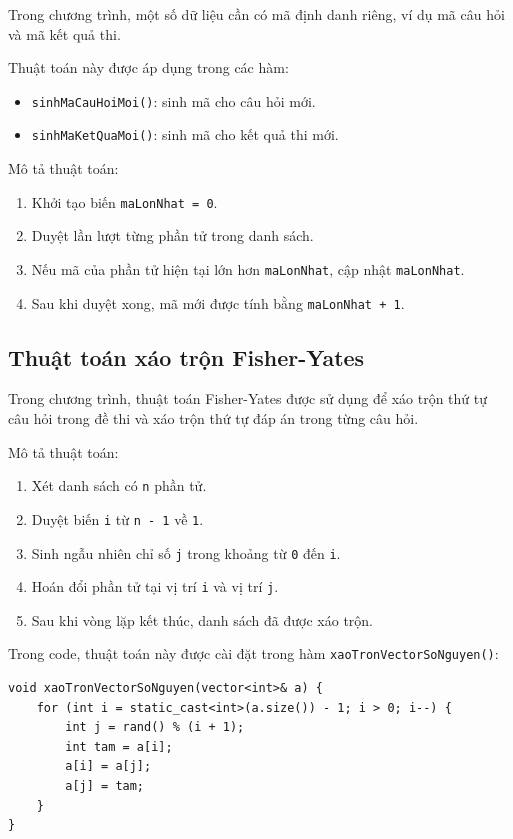 \documentclass[12pt,a4paper]{report}
\begin{document}
Trong chương trình, một số dữ liệu cần có mã định danh riêng, ví dụ mã câu hỏi và mã kết quả thi.

Thuật toán này được áp dụng trong các hàm:

\begin{itemize}
    \item \texttt{sinhMaCauHoiMoi()}: sinh mã cho câu hỏi mới.
    \item \texttt{sinhMaKetQuaMoi()}: sinh mã cho kết quả thi mới.
\end{itemize}

Mô tả thuật toán:

\begin{enumerate}
    \item Khởi tạo biến \texttt{maLonNhat = 0}.
    \item Duyệt lần lượt từng phần tử trong danh sách.
    \item Nếu mã của phần tử hiện tại lớn hơn \texttt{maLonNhat}, cập nhật \texttt{maLonNhat}.
    \item Sau khi duyệt xong, mã mới được tính bằng \texttt{maLonNhat + 1}.
\end{enumerate}

\subsection{Thuật toán xáo trộn Fisher-Yates}

Trong chương trình, thuật toán Fisher-Yates được sử dụng để xáo trộn thứ tự câu hỏi trong đề thi và xáo trộn thứ tự đáp án trong từng câu hỏi.

Mô tả thuật toán:

\begin{enumerate}
    \item Xét danh sách có \texttt{n} phần tử.
    \item Duyệt biến \texttt{i} từ \texttt{n - 1} về \texttt{1}.
    \item Sinh ngẫu nhiên chỉ số \texttt{j} trong khoảng từ \texttt{0} đến \texttt{i}.
    \item Hoán đổi phần tử tại vị trí \texttt{i} và vị trí \texttt{j}.
    \item Sau khi vòng lặp kết thúc, danh sách đã được xáo trộn.
\end{enumerate}

Trong code, thuật toán này được cài đặt trong hàm \texttt{xaoTronVectorSoNguyen()}:

\begin{lstlisting}[style=cppstyle, caption={Xáo trộn vector bằng Fisher-Yates}]
void xaoTronVectorSoNguyen(vector<int>& a) {
    for (int i = static_cast<int>(a.size()) - 1; i > 0; i--) {
        int j = rand() % (i + 1);
        int tam = a[i];
        a[i] = a[j];
        a[j] = tam;
    }
}
\end{lstlisting}
\end{document}
